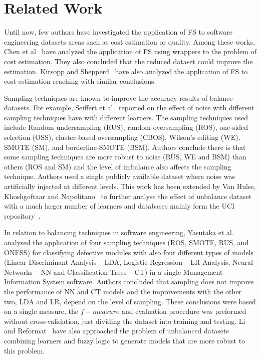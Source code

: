 \documentclass{elsart}
\begin{document}
\section{Related Work}
\label{sec:relatedWork}

Until now, few authors have investigated the application of FS to software engineering datasets areas such as cost estimation or
quality. Among these works, Chen et al~\cite{ChenEtAl:05} have analyzed the application of FS using wrappers to the problem of cost estimation. They also concluded that the reduced dataset could improve the estimation. Kirsopp and Shepperd~\cite{kirsoppShepperd:02} have also analyzed the application of FS to cost estimation reaching with similar conclusions.

Sampling techniques are known to improve the accuracy results of balance datasets. For example, Seiffert et al~\cite{SeiffertEtAl07} reported on the effect of noise with different sampling techniques have with different learners. The sampling techniques used include Random undersampling (RUS), random oversampling (ROS), one-sided selection (OSS), cluster-based oversampling (CBOS), Wilson's editing (WE), SMOTE (SM), and borderline-SMOTE (BSM). Authors conclude there is that some sampling techniques are more robust to noise (RUS, WE and BSM) than others (ROS and SM) and the level of imbalance also affects the sampling technique. Authors used a single publicly available dataset where noise was artificially injected at different levels. This work has been extended by Van Hulse, Khoshgoftaar and Napolitano~\cite{VanHulse+EtAl:2007} to further analyse the effect of unbalance dataset with a much larger number of learners and databases mainly form the UCI repository~\cite{Asuncion+Newman:2007}.

In relation to balancing techniques in software engineering, Yasutaka et al.~\cite{YasutakaEtAl:07} analysed the application of
four sampling techniques (ROS, SMOTE, RUS, and ONESS) for classifying defective modules with also four different types of
models (Linear Discriminant Analysis -- LDA, Logistic Regression -- LR Analysis, Neural Networks -- NN and Classification Trees -- CT) in a single Management Information System software. Authors concluded that sampling does not improve the performance of NN and
CT models and the improvements with the other two, LDA and LR, depend on the level of sampling. These conclusions were based on a
single measure, the $f-measure$ and evaluation procedure was preformed without cross-validation, just dividing the dataset into
training and testing. Li and Reformat~\cite{Li+Reformat:2007} have also approached the problem of unbalanced datasets combining
learners and fuzzy logic to generate models that are more robust to this problem.
\end{document}
